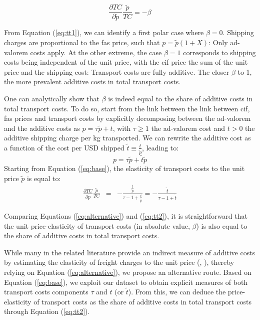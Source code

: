 \documentclass[a4paper,11pt]{article}
\begin{document}
\begin{equation}
\frac{\partial TC}{\partial \widetilde{p}} \frac{\widetilde{p}}{TC} = - \beta \label{eq:alternative}
\end{equation}

From Equation (\ref{eq:tt1}), we can identify a first polar case where $\beta=0$. Shipping charges are proportional to the fas price, such that $p=\widetilde{p}(1+X)$: Only ad-valorem costs apply. At the other extreme, the case $\beta=1$ corresponds to shipping costs being independent of the unit price, with the cif price the sum of the unit price and the shipping cost: Transport costs are fully additive. The closer $\beta$ to 1, the more prevalent additive costs in total transport costs.


One can analytically show that $\beta$ is indeed equal to the share of additive costs in total transport costs. To do so, start from the link between the link between cif, fas prices and transport costs by explicitly decomposing between the ad-valorem and the additive costs as $p = \tau \widetilde{p}+ t$, with $\tau \geq 1$ the ad-valorem cost and $t>0 $ the additive shipping charge per kg transported. We can rewrite the additive cost as a function of the cost per USD shipped $\widetilde{t} \equiv \frac{t}{\widetilde{p}}$, leading to:
\begin{equation}
p = \tau \widetilde{p}+ \widetilde{t}\widetilde{p}  \label{eq:base}
\end{equation}
Starting from Equation (\ref{eq:base}), the elasticity of transport costs to the unit price $\widetilde{p}$ is equal to:
\begin{eqnarray}
\frac{\partial TC}{\partial \widetilde{p}} \frac{\tilde{p}}{TC}&=& -\frac{\frac{t}{\tilde{p}}}{\tau -1  +\frac{t}{\tilde{p}}} = -\frac{\widetilde{t}}{\tau-1 +\widetilde{t}} \label{eq:tt2}
\end{eqnarray}

Comparing Equations (\ref{eq:alternative}) and (\ref{eq:tt2}), it is straightforward that the unit price-elasticity of transport costs (in absolute value, $\beta$) is also equal to the share of additive costs in total transport costs.

While many in the related literature provide an indirect measure of additive costs by estimating the elasticity of freight charges to the unit price (\citealp{hummels_skiba}, \citealp{Lashkaripour_JIE2020}), thereby relying on Equation (\ref{eq:alternative}), we propose an alternative route. Based on Equation (\ref{eq:base}), we exploit our dataset to obtain explicit measures of both transport costs components $\tau$ and $t$ (or $\widetilde{t}$). From this, we can deduce the price-elasticity of transport costs as the share of additive costs in total transport costs through Equation (\ref{eq:tt2}).
\end{document}
